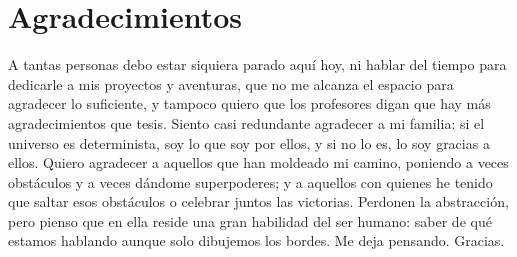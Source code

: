 
\chapter*{Agradecimientos}
A tantas personas debo estar siquiera parado aquí hoy, ni hablar del tiempo para dedicarle a mis proyectos y aventuras, que no me alcanza el espacio para agradecer lo suficiente, y tampoco quiero que los profesores digan que hay más agradecimientos que tesis. Siento casi redundante agradecer a mi familia: si el universo es determinista, soy lo que soy por ellos, y si no lo es, lo soy gracias a ellos. Quiero agradecer a aquellos que han moldeado mi camino, poniendo a veces obstáculos y a veces dándome superpoderes; y a aquellos con quienes he tenido que saltar esos obstáculos o celebrar juntos las victorias. Perdonen la abstracción, pero pienso que en ella reside una gran habilidad del ser humano: saber de qué estamos hablando aunque solo dibujemos los bordes. Me deja pensando. Gracias.
